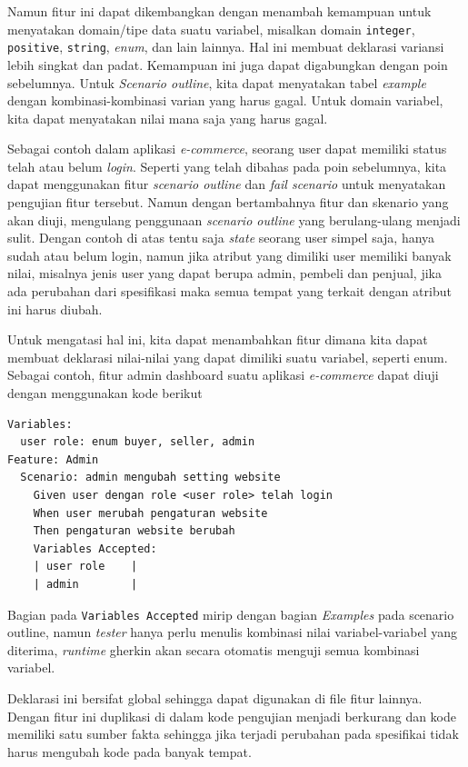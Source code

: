 Namun fitur ini dapat dikembangkan dengan menambah kemampuan untuk menyatakan domain/tipe data suatu variabel, misalkan
domain \texttt{integer}, \texttt{positive}, \texttt{string}, \emph{enum}, dan lain lainnya.
Hal ini membuat deklarasi variansi lebih singkat dan padat.
Kemampuan ini juga dapat digabungkan dengan poin sebelumnya.
Untuk \emph{Scenario outline}, kita dapat menyatakan tabel \emph{example} dengan
kombinasi-kombinasi varian yang harus gagal.
Untuk domain variabel, kita dapat menyatakan nilai mana saja yang harus gagal.

Sebagai contoh dalam aplikasi \emph{e-commerce}, seorang user dapat memiliki status
telah atau belum \emph{login}. Seperti yang telah dibahas pada poin sebelumnya, kita dapat
menggunakan fitur \emph{scenario outline} dan \emph{fail scenario} untuk menyatakan
pengujian fitur tersebut. Namun dengan bertambahnya fitur dan skenario yang akan diuji,
mengulang penggunaan \emph{scenario outline} yang berulang-ulang menjadi sulit. Dengan contoh
di atas tentu saja \emph{state} seorang user simpel saja, hanya sudah atau belum login, namun
jika atribut yang dimiliki user memiliki banyak nilai, misalnya jenis user yang dapat
berupa admin, pembeli dan penjual, jika ada perubahan dari spesifikasi maka semua tempat
yang terkait dengan atribut ini harus diubah.

Untuk mengatasi hal ini, kita dapat menambahkan fitur dimana kita dapat membuat deklarasi
nilai-nilai yang dapat dimiliki suatu variabel, seperti enum. Sebagai contoh, fitur admin
dashboard suatu aplikasi \emph{e-commerce} dapat diuji dengan menggunakan kode berikut

\begin{lstlisting}[language=gherkin]
Variables:
  user role: enum buyer, seller, admin
Feature: Admin
  Scenario: admin mengubah setting website
    Given user dengan role <user role> telah login
    When user merubah pengaturan website
    Then pengaturan website berubah
    Variables Accepted:
    | user role    |
    | admin        |
\end{lstlisting}

Bagian pada \texttt{Variables Accepted} mirip dengan bagian \emph{Examples} pada
scenario outline, namun \emph{tester} hanya perlu menulis kombinasi nilai variabel-variabel
yang diterima, \emph{runtime} gherkin akan secara otomatis menguji semua kombinasi variabel.

Deklarasi ini bersifat global sehingga dapat digunakan di file fitur lainnya.
Dengan fitur ini duplikasi di dalam kode pengujian menjadi berkurang dan
kode memiliki satu sumber fakta sehingga jika terjadi perubahan pada spesifikai tidak
harus mengubah kode pada banyak tempat.


